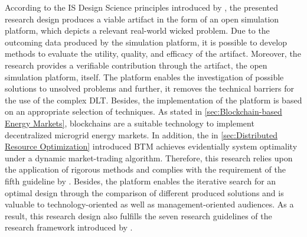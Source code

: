 According to the IS Design Science principles introduced by , 
the presented research design produces a viable artifact in the form of an open simulation platform, which depicts a 
relevant real-world wicked problem. Due to the outcoming data produced by the simulation platform, 
it is possible to develop methods to evaluate the utility, quality, and efficacy of the artifact. 
Moreover, the research provides a verifiable contribution through the artifact, the open simulation platform, itself. 
The platform enables the investigation of possible solutions to unsolved problems and further, 
it removes the technical barriers for the use of the complex DLT. 
Besides, the implementation of the platform is based on an appropriate selection of techniques. 
As stated in \ref{sec:Blockchain-based Energy Markets}, 
blockchains are a suitable technology to implement decentralized microgrid energy markets. 
In addition, the in \ref{sec:Distributed Resource Optimization} introduced BTM achieves evidentially system 
optimality under a dynamic market-trading algorithm. 
Therefore, this research relies upon the application of rigorous methods and complies with the requirement 
of the fifth guideline by . 
Besides, the platform enables the iterative search for an optimal design through the comparison 
of different produced solutions and is valuable to technology-oriented as well as management-oriented 
audiences. As a result, this research design also fulfills the seven research guidelines of 
the research framework introduced by . 
